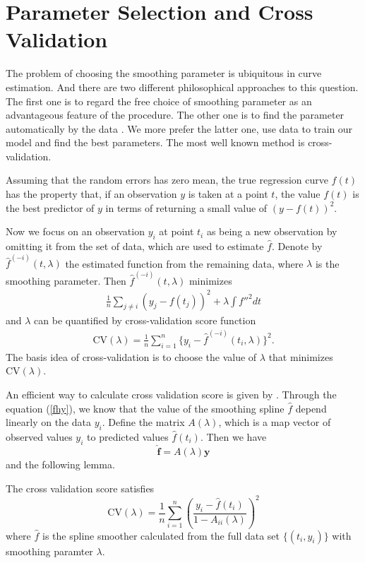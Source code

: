 \section{Parameter Selection and Cross Validation}

The problem of choosing the smoothing parameter is ubiquitous in curve estimation. And there are two different philosophical approaches to this question. The first one is to regard the free choice of smoothing parameter as an advantageous feature of the procedure. The other one is to find the parameter automatically by the data \cite{green1993nonparametric}. We more prefer the latter one, use data to train our model and find the best parameters. The most well known method is cross-validation.


Assuming that the random errors has zero mean, the true regression curve $f(t)$ has the property that, if an observation $y$ is taken at a point $t$, the value $f(t)$ is the best predictor of $y$ in terms of returning a small value of $(y-f(t))^2$. 

Now we focus on an observation $y_i$ at point $t_i$ as being a new observation by omitting it from the set of data, which are used to estimate $\hat{f}$. Denote by $\hat{f}^{(-i)}(t,\lambda)$ the estimated function from the remaining data, where $\lambda$ is the smoothing parameter. Then $\hat{f}^{(-i)}(t,\lambda)$ minimizes 
\begin{align}\label{originalcv}
\frac{1}{n}\sum_{j \neq i}(y_j-f(t_j))^2+\lambda \int f''^2dt
\end{align}
 and $\lambda$ can be quantified by cross-validation score function
\begin{align}
\mbox{CV}(\lambda)=\frac{1}{n}\sum_{i=1}^{n}\{y_i-\hat{f}^{(-i)}(t_i,\lambda)\}^2.
\end{align}
The basis idea of cross-validation is to choose the value of $\lambda$ that minimizes $\mbox{CV}(\lambda)$. 

An efficient way to calculate cross validation score is given by \cite{green1993nonparametric}. Through the equation (\ref{fhy}), we know that the value of the smoothing spline $\hat{f}$ depend linearly on the data $y_i$. Define the matrix $A(\lambda)$, which is a map vector of observed values $y_i$ to predicted values $\hat{f}(t_i)$. Then we have
\begin{equation}
\hat{\mathbf{f}}=A(\lambda)\mathbf{y}
\end{equation}
and the following lemma.
\begin{lemma}\label{cvlema}
The cross validation score satisfies
\begin{equation}
\mbox{CV}(\lambda)=\frac{1}{n} \sum_{i=1}^n \left(\frac{y_i-\hat{f}(t_i)}{1-A_{ii}(\lambda)}\right)^2
\end{equation}
where $\hat{f}$ is the spline smoother calculated from the full data set $\{(t_i,y_i)\}$ with smoothing paramter $\lambda$.
\end{lemma}

